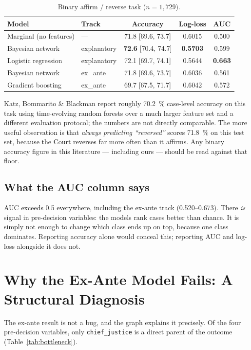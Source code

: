 \documentclass[11pt]{article}
\newcommand{\code}[1]{\texttt{#1}}
\begin{document}
\begin{table}[t]
\centering
\caption{Binary affirm / reverse task ($n = 1{,}729$).}
\label{tab:binary}
\begin{tabular}{llccc}
\toprule
Model & Track & Accuracy & Log-loss & AUC \\
\midrule
Marginal (no features) & ---          & 71.8 [69.6, 73.7] & 0.6015 & 0.500 \\
Bayesian network       & explanatory  & \textbf{72.6} [70.4, 74.7] & \textbf{0.5703} & 0.599 \\
Logistic regression    & explanatory  & 72.1 [69.7, 74.1] & 0.5644 & \textbf{0.663} \\
Bayesian network       & ex\_ante     & 71.8 [69.6, 73.7] & 0.6036 & 0.561 \\
Gradient boosting      & ex\_ante     & 69.7 [67.5, 71.7] & 0.6042 & 0.572 \\
\bottomrule
\end{tabular}
\end{table}

Katz, Bommarito \& Blackman \cite{katz2017} report roughly \SI{70.2}{\percent}
case-level accuracy on this task using time-evolving random forests over a much
larger feature set and a different evaluation protocol; the numbers are not
directly comparable. The more useful observation is that \emph{always predicting
``reversed''} scores \SI{71.8}{\percent} on this test set, because the Court
reverses far more often than it affirms. Any binary accuracy figure in this
literature --- including ours --- should be read against that floor.

\subsection{What the AUC column says}

AUC exceeds 0.5 everywhere, including the ex-ante track (0.520--0.673). There
\emph{is} signal in pre-decision variables: the models rank cases better than
chance. It is simply not enough to change which class ends up on top, because
one class dominates. Reporting accuracy alone would conceal this; reporting AUC
and log-loss alongside it does not.

\section{Why the Ex-Ante Model Fails: A Structural Diagnosis}
\label{sec:diagnosis}

The ex-ante result is not a bug, and the graph explains it precisely. Of the
four pre-decision variables, only \code{chief\_justice} is a direct parent of
the outcome (Table~\ref{tab:bottleneck}).
\end{document}
